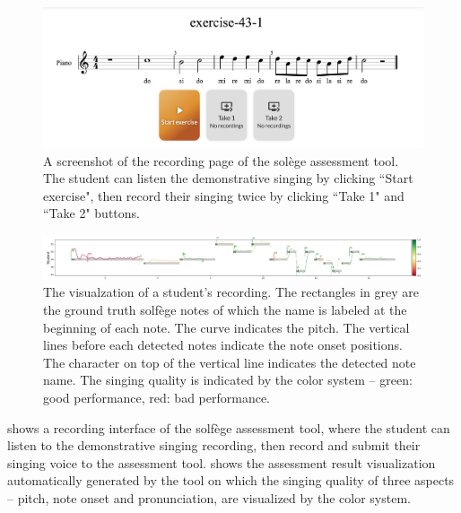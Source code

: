 \begin{landscape}
\mbox{}\vfill
\begin{figure}[ht!]
    \centering
    \includegraphics[width=1.8\textwidth]{figs/ch8/ch8_mc1.png}
    \caption{A screenshot of the recording page of the solège assessment tool. The student can listen the demonstrative singing by clicking ``Start exercise", then record their singing twice by clicking ``Take 1" and ``Take 2" buttons.}
    \label{fig:ch8:recording_interface}
\end{figure}
\vfill
\end{landscape}

\begin{landscape}
\mbox{}\vfill
\begin{figure}[ht!]
    \includegraphics[width=1.8\textwidth]{figs/ch8/ch8_mc2.png}
    \caption{The visualzation of a student's recording. The rectangles in grey are the ground truth solfège notes of which the name is labeled at the beginning of each note. The curve indicates the pitch. The vertical lines before each detected notes indicate the note onset positions. The character on top of the vertical line indicates the detected note name. The singing quality is indicated by the color system -- green: good performance, red: bad performance.}
    \label{fig:ch8:eval_visual}
\end{figure}
\vfill
\end{landscape}

 shows a recording interface of the solfège assessment tool, where the student can listen to the demonstrative singing recording, then record and submit their singing voice to the assessment tool.  shows the assessment result visualization automatically generated by the tool on which the singing quality of three aspects -- pitch, note onset and pronunciation, are visualized by the color system.


